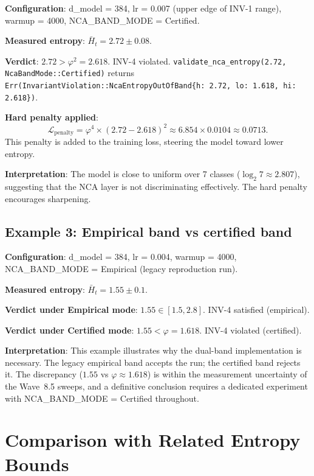 \textbf{Configuration}: d\_model = 384, lr = 0.007 (upper edge of
INV-1 range), warmup = 4000, NCA\_BAND\_MODE = Certified.

\textbf{Measured entropy}: \(\bar{H}_t = 2.72 \pm 0.08\).

\textbf{Verdict}: \(2.72 > \varphi^2 = 2.618\).  INV-4 violated.
\texttt{validate\_nca\_entropy(2.72, NcaBandMode::Certified)} returns
\texttt{Err(InvariantViolation::NcaEntropyOutOfBand\{h: 2.72, lo: 1.618, hi: 2.618\})}.

\textbf{Hard penalty applied}:
\[
  \mathcal{L}_\mathrm{penalty} = \varphi^4 \times (2.72 - 2.618)^2
  \approx 6.854 \times 0.0104 \approx 0.0713.
\]
This penalty is added to the training loss, steering the model toward
lower entropy.

\textbf{Interpretation}: The model is close to uniform over 7 classes
(\(\log_2 7 \approx 2.807\)), suggesting that the NCA layer is not
discriminating effectively.  The hard penalty encourages sharpening.

\subsection{Example 3: Empirical band vs certified band}
\label{subsec:example-empirical}

\textbf{Configuration}: d\_model = 384, lr = 0.004, warmup = 4000,
NCA\_BAND\_MODE = Empirical (legacy reproduction run).

\textbf{Measured entropy}: \(\bar{H}_t = 1.55 \pm 0.1\).

\textbf{Verdict under Empirical mode}: \(1.55 \in [1.5, 2.8]\).
INV-4 satisfied (empirical).

\textbf{Verdict under Certified mode}: \(1.55 < \varphi = 1.618\).
INV-4 violated (certified).

\textbf{Interpretation}: This example illustrates why the dual-band
implementation is necessary.  The legacy empirical band accepts the
run; the certified band rejects it.  The discrepancy (\(1.55\) vs
\(\varphi \approx 1.618\)) is within the measurement uncertainty of
the Wave~8.5 sweeps, and a definitive conclusion requires a dedicated
experiment with NCA\_BAND\_MODE = Certified throughout.

\section{Comparison with Related Entropy Bounds}
\label{sec:e8-entropy-compare}

